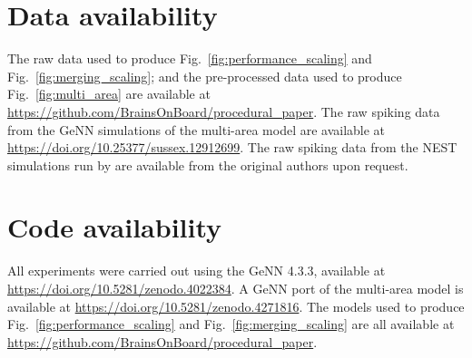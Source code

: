 \documentclass[9pt,a4paper]{amsart}
\begin{document}
\section{Data availability}
The raw data used to produce Fig.~\ref{fig:performance_scaling} and Fig.~\ref{fig:merging_scaling}; and the pre-processed data used to produce Fig.~\ref{fig:multi_area} are available at \url{https://github.com/BrainsOnBoard/procedural_paper}.
The raw spiking data from the GeNN simulations of the multi-area model are available at \url{https://doi.org/10.25377/sussex.12912699}.
The raw spiking data from the NEST simulations run by \citet{Schmidt2018} are available from the original authors upon request.

\section{Code availability}
All experiments were carried out using the GeNN 4.3.3, available at \url{https://doi.org/10.5281/zenodo.4022384}.
A GeNN port of the multi-area model is available at \url{https://doi.org/10.5281/zenodo.4271816}.
The models used to produce Fig.~\ref{fig:performance_scaling} and Fig.~\ref{fig:merging_scaling} are all available at \url{https://github.com/BrainsOnBoard/procedural_paper}.



\end{document}
